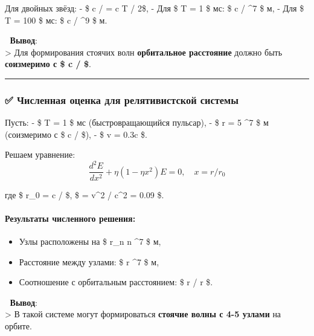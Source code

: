\documentclass[11pt]{article}
\providecommand{\tightlist}{%
      \setlength{\itemsep}{0pt}\setlength{\parskip}{0pt}}
\begin{document}
Для двойных звёзд: - \$ c / \omega = c T / 2\pi \$, - Для \$ T = 1 \$
мс: \$ c / \omega {} \^{}7 \$ м, - Для \$ T = 100 \$
мс: \$ c / \omega {} \^{}9 \$ м.

📌 \textbf{Вывод}:\\
\textgreater{} Для формирования стоячих волн \textbf{орбитальное
расстояние} должно быть \textbf{соизмеримо с \$ c / \omega \$}.

\begin{center}\rule{0.5\linewidth}{\linethickness}\end{center}

\subsubsection{✅ Численная оценка для релятивистской
системы}\label{ux447ux438ux441ux43bux435ux43dux43dux430ux44f-ux43eux446ux435ux43dux43aux430-ux434ux43bux44f-ux440ux435ux43bux44fux442ux438ux432ux438ux441ux442ux441ux43aux43eux439-ux441ux438ux441ux442ux435ux43cux44b}

Пусть: - \$ T = 1 \$ мс (быстровращающийся пульсар), - \$ r = 5
\^{}7 \$ м (соизмеримо с \$ c / \omega \$), - \$ v = 0.3c \$.

Решаем уравнение: \[
\frac{d^2 E}{dx^2} + \eta (1 - \eta x^2) E = 0, \quad x = r / r_0
\]

где \$ r\_0 = c / \omega \$, \$ \eta = v\^{}2 / c\^{}2 = 0.09 \$.

\paragraph{Результаты численного
решения:}\label{ux440ux435ux437ux443ux43bux44cux442ux430ux442ux44b-ux447ux438ux441ux43bux435ux43dux43dux43eux433ux43e-ux440ux435ux448ux435ux43dux438ux44f}

\begin{itemize}
\tightlist
\item
  Узлы расположены на \$ r\_n  n \^{}7 \$ м,
\item
  Расстояние между узлами: \$ \Delta r  \^{}7 \$ м,
\item
  Соотношение с орбитальным расстоянием: \$ r / \Delta r  \$.
\end{itemize}

📌 \textbf{Вывод}:\\
\textgreater{} В такой системе могут формироваться \textbf{стоячие волны
с 4-5 узлами} на орбите.
\end{document}
